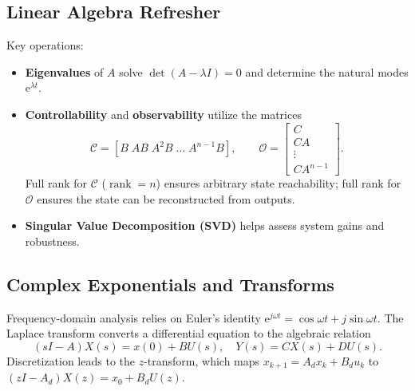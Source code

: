 \subsection{Linear Algebra Refresher}
Key operations:
\begin{itemize}[leftmargin=*]
    \item \textbf{Eigenvalues} of $A$ solve $\det(A - \lambda I) = 0$ and determine the natural modes $\mathrm{e}^{\lambda t}$.
    \item \textbf{Controllability} and \textbf{observability} utilize the matrices
    \begin{equation}
        \mathcal{C} = [B\; AB\; A^2B\; \dots\; A^{n-1}B], \qquad
        \mathcal{O} =
        \begin{bmatrix}
            C\\ CA\\ \vdots \\ CA^{n-1}
        \end{bmatrix}.
    \end{equation}
      Full rank for $\mathcal{C}$ ($\operatorname{rank}=n$) ensures arbitrary state reachability; full rank for $\mathcal{O}$ ensures the state can be reconstructed from outputs.
    \item \textbf{Singular Value Decomposition (SVD)} helps assess system gains and robustness.
\end{itemize}

\subsection{Complex Exponentials and Transforms}
Frequency-domain analysis relies on Euler's identity $\mathrm{e}^{j \omega t} = \cos \omega t + j \sin \omega t$. The Laplace transform converts a differential equation to the algebraic relation
\begin{equation}
    (sI - A) X(s) = x(0) + B U(s), \quad Y(s) = C X(s) + D U(s).
\end{equation}
Discretization leads to the $z$-transform, which maps $x_{k+1} = A_d x_k + B_d u_k$ to $(zI - A_d) X(z) = x_0 + B_d U(z)$.

